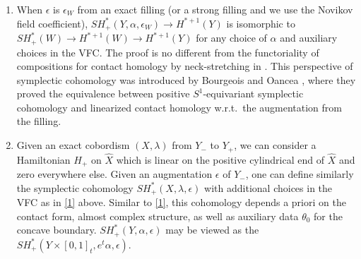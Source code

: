 \documentclass[reqno,11pt]{amsart}
\numberwithin{equation}{section}
\begin{document}
\begin{enumerate}
    It is expected that such symplectic cohomology is independent of contact forms, almost complex structures, $\theta$, as well as augmentations up to DGA homotopies. As a consequence of this expectation, the set of all such symplectic cohomologies is a contact invariant. The usual invariance proof for symplectic cohomology/Hamiltonian-Floer cohomology can only show the invariance for extensions $\theta$ of $\theta_0$ and choices of Hamiltonians. Different choices of $\alpha,J$ and $\theta_0$ were shown to give rise to contact DGAs that are chain homotopic to each other \cite{zbMATH07085531}. On the other hand, the symplectic cohomology here is similar to the linearized contact homology. In particular, one would like to have DGA homotopies between them, which would allow us to define the homotopy classes of augmentations (independent of $\alpha,J,\theta_0$) and prove the invariance of $SH_+^*(Y,\alpha,J,\theta,\epsilon)$.
    \item When $\epsilon$ is $\epsilon_{W}$ from an exact filling (or a strong filling and we use the Novikov field coefficient), $SH^*_+(Y,\alpha,\epsilon_W)\to H^{*+1}(Y)$ is isomorphic to $SH^*_+(W)\to H^{*+1}(W)\to H^{*+1}(Y)$ for any choice of $\alpha$ and auxiliary choices in the VFC. The proof is no different from the functoriality of compositions for contact homology by neck-stretching in \cite[\S 1.5]{zbMATH07085531}. This perspective of symplectic cohomology was introduced by Bourgeois and Oancea \cite{MR2471597}, where they proved the equivalence between positive $S^1$-equivariant symplectic cohomology and linearized contact homology w.r.t.\ the augmentation from the filling. 
    \item Given an exact cobordism $(X,\lambda)$ from $Y_-$ to $Y_+$, we can consider a Hamiltonian $H_+$ on $\widehat{X}$ which is linear on the positive cylindrical end of $\widehat{X}$ and zero everywhere else. Given an augmentation $\epsilon$ of $Y_-$, one can define similarly the symplectic cohomology $SH_+^*(X,\lambda,\epsilon)$ with additional choices in the VFC as in \eqref{1} above. Similar to \eqref{1}, this cohomology depends a priori on the contact form, almost complex structure, as well as auxiliary data $\theta_0$ for the concave boundary.  $SH_+^*(Y,\alpha,\epsilon)$ may be viewed as the $SH_+^*(Y\times[0,1]_t,e^t\alpha,\epsilon)$.
    

\end{enumerate}
\end{document}
